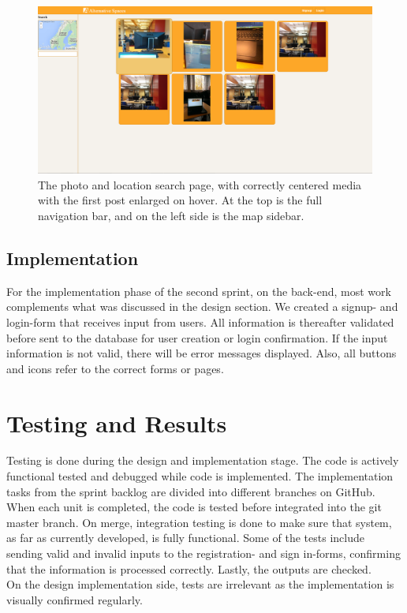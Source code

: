 \begin{figure}[ht!]
\centering
\includegraphics[width={\linewidth}]{Sprint2/img/Sprint2-PhotoPage.png}
\caption{The photo and location search page, with correctly centered media with the first post enlarged on hover. At the top is the full navigation bar, and on the left side is the map sidebar. \label{overflow}}
\end{figure}


\subsection{Implementation}
\label{subsec:S2DesignImplImpl}
For the implementation phase of the second sprint, on the back-end, most work complements what was discussed in the design section. We created a signup- and login-form that receives input from users. All information is thereafter validated before sent to the database for user creation or login confirmation. If the input information is not valid, there will be error messages displayed. Also, all buttons and icons refer to the correct forms or pages. 

\section{Testing and Results}
\label{sec:S2Testing}
Testing is done during the design and implementation stage. The code is actively functional tested and debugged while code is implemented. The implementation tasks from the sprint backlog are divided into different branches on GitHub. When each unit is completed, the code is tested before integrated into the git master branch. On merge, integration testing is done to make sure that system, as far as currently developed, is fully functional. Some of the tests include sending valid and invalid inputs to the registration- and sign in-forms, confirming that the information is processed correctly. Lastly, the outputs are checked. \\
On the design implementation side, tests are irrelevant as the implementation is visually confirmed regularly. 


